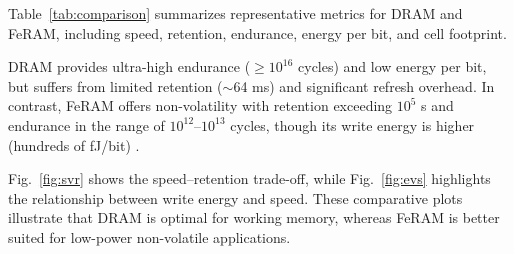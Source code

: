 Table~\ref{tab:comparison} summarizes representative metrics for DRAM and FeRAM, including speed, retention, endurance, energy per bit, and cell footprint. 

DRAM provides ultra-high endurance ($\geq 10^{16}$ cycles) and low energy per bit, but suffers from limited retention ($\sim$64 ms) and significant refresh overhead. In contrast, FeRAM offers non-volatility with retention exceeding $10^{5}$ s and endurance in the range of $10^{12}$--$10^{13}$ cycles, though its write energy is higher (hundreds of fJ/bit) \cite{noheda2023,martin2020}. 

Fig.~\ref{fig:svr} shows the speed--retention trade-off, while Fig.~\ref{fig:evs} highlights the relationship between write energy and speed. These comparative plots illustrate that DRAM is optimal for working memory, whereas FeRAM is better suited for low-power non-volatile applications.
